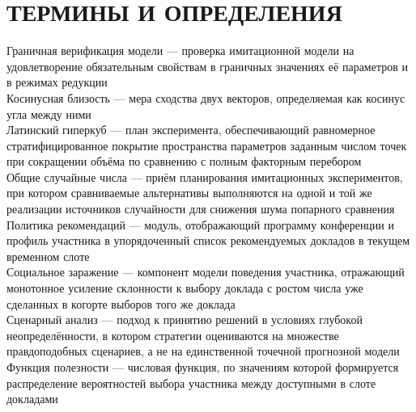 \chapter*{ТЕРМИНЫ И ОПРЕДЕЛЕНИЯ}
\begingroup
\setlength{\parindent}{0pt}
Граничная верификация модели --- проверка имитационной модели на удовлетворение обязательным свойствам в граничных значениях её параметров и в режимах редукции\\[0.5em]
Косинусная близость --- мера сходства двух векторов, определяемая как косинус угла между ними\\[0.5em]
Латинский гиперкуб --- план эксперимента, обеспечивающий равномерное стратифицированное покрытие пространства параметров заданным числом точек при сокращении объёма по сравнению с полным факторным перебором\\[0.5em]
Общие случайные числа --- приём планирования имитационных экспериментов, при котором сравниваемые альтернативы выполняются на одной и той же реализации источников случайности для снижения шума попарного сравнения\\[0.5em]
Политика рекомендаций --- модуль, отображающий программу конференции и профиль участника в упорядоченный список рекомендуемых докладов в текущем временном слоте\\[0.5em]
Социальное заражение --- компонент модели поведения участника, отражающий монотонное усиление склонности к выбору доклада с ростом числа уже сделанных в когорте выборов того же доклада\\[0.5em]
Сценарный анализ --- подход к принятию решений в условиях глубокой неопределённости, в котором стратегии оцениваются на множестве правдоподобных сценариев, а не на единственной точечной прогнозной модели\\[0.5em]
Функция полезности --- числовая функция, по значениям которой формируется распределение вероятностей выбора участника между доступными в слоте докладами
\endgroup
